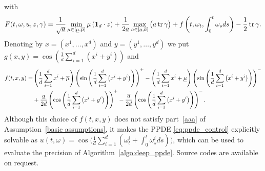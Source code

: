 \documentclass[12pt]{article}
\numberwithin{equation}{section}
\newcommand{\ubar}[1]{\smash{\underline {#1}}}
\def\tr{\mathop{\hbox{\rm tr}}\nolimits}
\let\oldcitet=\citet
\renewcommand{\cite}[1]{\textcolor[rgb]{0,0,1}{\oldcitet{#1}}}
\renewcommand{\citet}[1]{\textcolor[rgb]{0,0,1}{\oldcitet{#1}}}
\begin{document}
with
$$
F (t, \omega, u, z, \gamma)
=
\frac{1}{\sqrt{\ubar{a}}}
\min\limits_{\mu \in [\ubar{\mu}, \overline{\mu}]} \mu \left(\bm{1}_d \cdot
 z  \right)
+ \frac{1}{2
\ubar{a}
} \max\limits_{a \in [\ubar{a}, \overline{a}]}
\big( a \tr \gamma \big)
    + f\left(t, \omega_t, \int_0^t \omega_s ds\right)
    - \frac{1}{2} \tr {\gamma}
    .
    $$
 Denoting by $x = (x^1, \ldots, x^d)$ and $y = (y^1, \ldots, y^d)$
we put $g(x, y) = \cos\left(\frac{1}{d}\sum\limits_{i = 1}^d \left(x^i+y^i\right)\right)$ and
\begin{align*}
    f(t, x, y) = & \left(\frac{1}{d}\sum\limits_{i = 1}^d x^i + \overline{\mu}\right)\left(\sin\left(\frac{1}{d}\sum\limits_{i = 1}^d \left(x^i+y^i\right)\right)\right)^{+}
                  -\left(\frac{1}{d}\sum\limits_{i = 1}^d x^i + \ubar{\mu}\right)\left(\sin\left(\frac{1}{d}\sum\limits_{i = 1}^d \left(x^i+y^i\right)\right)\right)^{-}
                 \\
                 & +\frac{\ubar{a}}{2d}\left(\cos\left(\frac{1}{d}\sum\limits_{i = 1}^d \left(x^i+y^i\right)\right)\right)^{+}
                -\frac{\overline{a}}{2d}\left(\cos\left(\frac{1}{d}\sum\limits_{i = 1}^d \left(x^i+y^i\right)\right)\right)^{-}.
\end{align*}
Although this choice of $f(t,x,y)$ does not satisfy  part~\eqref{aaa} of Assumption~\ref{basic assumptions},
it makes the PPDE \eqref{eq:ppde_control} explicitly solvable as
$\displaystyle
 u(t, \omega) = \cos \bigg(\frac{1}{d}\sum\limits_{i = 1}^d \left(\omega_t^i+\int_0^t \omega_s^i ds \right)\bigg)$,
 which can be used to evaluate the precision of
 Algorithm~\ref{algo:deep_ppde}.
 Source codes are available on request.
\end{document}
